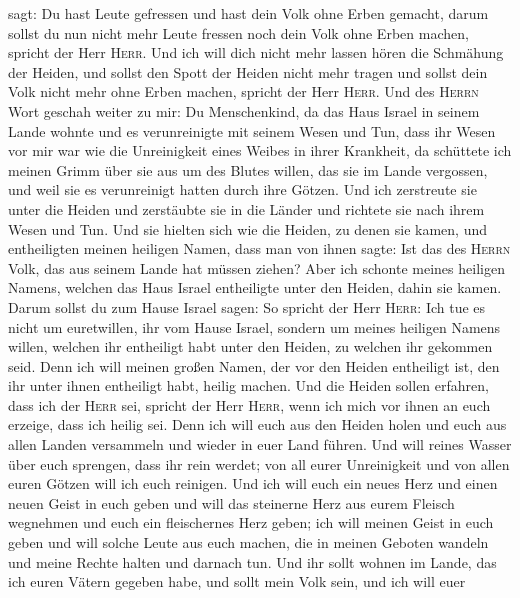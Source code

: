 sagt: Du hast Leute gefressen und hast dein Volk ohne Erben gemacht,
 darum sollst du nun nicht mehr Leute fressen noch dein
Volk ohne Erben machen, spricht der Herr \textsc{Herr}. 
Und ich will dich nicht mehr lassen hören die Schmähung der Heiden, und
sollst den Spott der Heiden nicht mehr tragen und sollst dein Volk nicht
mehr ohne Erben machen, spricht der Herr \textsc{Herr}. 
Und des \textsc{Herrn} Wort geschah weiter zu mir:  Du
Menschenkind, da das Haus Israel in seinem Lande wohnte und es
verunreinigte mit seinem Wesen und Tun, dass ihr Wesen vor mir war wie
die Unreinigkeit eines Weibes in ihrer Krankheit,  da
schüttete ich meinen Grimm über sie aus um des Blutes willen, das sie im
Lande vergossen, und weil sie es verunreinigt hatten durch ihre Götzen.
 Und ich zerstreute sie unter die Heiden und zerstäubte
sie in die Länder und richtete sie nach ihrem Wesen und Tun.
 Und sie hielten sich wie die Heiden, zu denen sie kamen,
und entheiligten meinen heiligen Namen, dass man von ihnen sagte: Ist
das des \textsc{Herrn} Volk, das aus seinem Lande hat müssen ziehen?
 Aber ich schonte meines heiligen Namens, welchen das
Haus Israel entheiligte unter den Heiden, dahin sie kamen.
 Darum sollst du zum Hause Israel sagen: So spricht der
Herr \textsc{Herr}: Ich tue es nicht um euretwillen, ihr vom Hause
Israel, sondern um meines heiligen Namens willen, welchen ihr entheiligt
habt unter den Heiden, zu welchen ihr gekommen seid. 
Denn ich will meinen großen Namen, der vor den Heiden entheiligt ist,
den ihr unter ihnen entheiligt habt, heilig machen. Und die Heiden
sollen erfahren, dass ich der \textsc{Herr} sei, spricht der Herr
\textsc{Herr}, wenn ich mich vor ihnen an euch erzeige, dass ich heilig
sei.  Denn ich will euch aus den Heiden holen und euch
aus allen Landen versammeln und wieder in euer Land führen.
 Und will reines Wasser über euch sprengen, dass ihr rein
werdet; von all eurer Unreinigkeit und von allen euren Götzen will ich
euch reinigen.  Und ich will euch ein neues Herz und
einen neuen Geist in euch geben und will das steinerne Herz aus eurem
Fleisch wegnehmen und euch ein fleischernes Herz geben; 
ich will meinen Geist in euch geben und will solche Leute aus euch
machen, die in meinen Geboten wandeln und meine Rechte halten und
darnach tun.  Und ihr sollt wohnen im Lande, das ich
euren Vätern gegeben habe, und sollt mein Volk sein, und ich will euer
